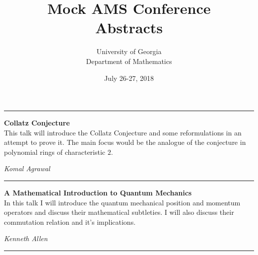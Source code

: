 \documentclass[oneside]{amsart}
\begin{document}
\title[Mock AMS]{Mock AMS Conference \\ Abstracts}
\date{July 26-27, 2018}
\author{University of Georgia \\ Department of Mathematics}
\maketitle
\noindent\rule{\textwidth}{0.4pt}
\vspace{0.5em}

\filbreak
\hspace{-20pt}\textbf{ \textbf{ Collatz Conjecture } } \vspace{0.5em}\\
This talk will introduce the Collatz Conjecture and some reformulations in an attempt to prove it. The main focus would be the analogue of the conjecture in polynomial rings of characteristic $2$. \vspace{-1em}\\
\begin{flushright} \textit{ Komal Agrawal } \vspace{0.5em} \end{flushright}
\rule{\textwidth}{0.4pt}
\vspace{0.5em}

\filbreak
\hspace{-20pt}\textbf{ \textbf{ A Mathematical Introduction to Quantum Mechanics } } \vspace{0.5em}\\
In this talk I will introduce the quantum mechanical position and momentum operators and discuss their mathematical subtleties. I will also discuss their commutation relation and it's implications. \vspace{-1em}\\
\begin{flushright} \textit{ Kenneth Allen } \vspace{0.5em} \end{flushright}
\rule{\textwidth}{0.4pt}
\vspace{0.5em}
\end{document}
